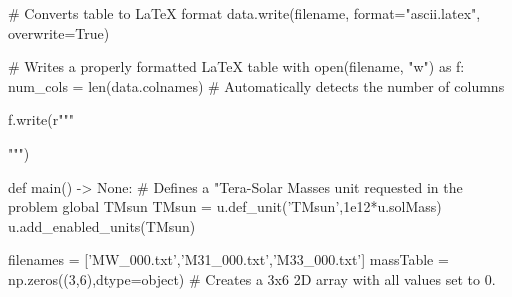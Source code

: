    # Converts table to LaTeX format
    data.write(filename, format="ascii.latex", overwrite=True)
    
    # Writes a properly formatted LaTeX table
    with open(filename, "w") as f:
        num_cols = len(data.colnames)  # Automatically detects the number of columns

        f.write(r"""\begin{table}[h]
        \centering
        \renewcommand{\arraystretch}{1.3}
        \setlength{\tabcolsep}{5pt}

        
        \caption{This table displays the total masses of the galactic
        halo, disk stars, and bulge stars in the Milky Way Galaxy
        (MW), Andromeda Galaxy (M31) and Triangulum Galaxy (M33). In
        addition, the total mass of each galaxy and the ratio of
        stellar mass to total mass, also known as the baryon
        fraction, is included in the fifth and sixth columns
        respectively. Note that the galactic halo is assumed to be
        entirely composed of dark matter. All values are in units
        $10^{12}\,M_\odot$.}
        
        \label{tab:galaxyMasses}
        \end{table}""")

def main() -> None:
    # Defines a "Tera-Solar Masses unit requested in the problem
    global TMsun
    TMsun = u.def_unit('TMsun',1e12*u.solMass)
    u.add_enabled_units(TMsun)

    filenames = ['MW_000.txt','M31_000.txt','M33_000.txt']
    massTable = np.zeros((3,6),dtype=object) # Creates a 3x6 2D array with all values set to 0.

